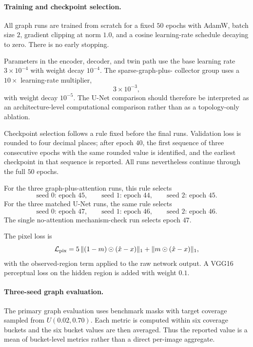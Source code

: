 \documentclass[12pt]{article}
\begin{document}
\paragraph{Training and checkpoint selection.}
All graph runs are trained from scratch for a fixed \(50\) epochs with AdamW,
batch size \(2\), gradient clipping at norm \(1.0\), and a cosine
learning-rate schedule decaying to zero. There is no early stopping.

Parameters in the encoder, decoder, and twin path use the base learning rate
\(3\times10^{-4}\) with weight decay \(10^{-4}\). The sparse-graph-plus-
collector group uses a \(10\times\) learning-rate multiplier,
\[
3\times10^{-3},
\]
with weight decay \(10^{-5}\). The U-Net comparison should therefore be
interpreted as an architecture-level computational comparison rather than as a
topology-only ablation.

Checkpoint selection follows a rule fixed before the final runs. Validation
loss is rounded to four decimal places; after epoch \(40\), the first sequence
of three consecutive epochs with the same rounded value is identified, and
the earliest checkpoint in that sequence is reported. All runs nevertheless
continue through the full \(50\) epochs.

For the three graph-plus-attention runs, this rule selects
\[
\text{seed 0: epoch 45},\qquad
\text{seed 1: epoch 44},\qquad
\text{seed 2: epoch 45}.
\]
For the three matched U-Net runs, the same rule selects
\[
\text{seed 0: epoch 47},\qquad
\text{seed 1: epoch 46},\qquad
\text{seed 2: epoch 46}.
\]
The single no-attention mechanism-check run selects epoch \(47\).

The pixel loss is
\[
\mathcal L_{\rm pix}
=
5\,\|(1-m)\odot(\hat x-x)\|_1
+
\|m\odot(\hat x-x)\|_1,
\]
with the observed-region term applied to the raw network output. A VGG16
perceptual loss on the hidden region is added with weight \(0.1\).
\paragraph{Three-seed graph evaluation.}
The primary graph evaluation uses benchmark masks with target coverage sampled
from \(U(0.02,0.70)\). Each metric is computed within six coverage buckets and
the six bucket values are then averaged. Thus the reported value is a mean of
bucket-level metrics rather than a direct per-image aggregate.
\end{document}
